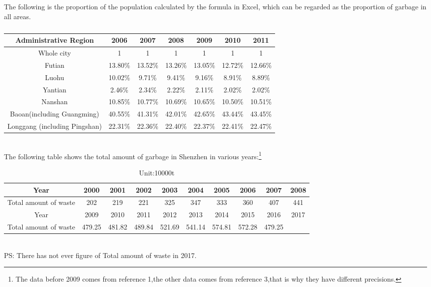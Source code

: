 \documentclass[UTF8]{article}
\begin{document}
The following is the proportion of the population calculated by the formula in Excel, which can be regarded as the proportion of garbage in all areas.
\begin{table}[h]
\caption{}
\begin{center}
\begin{tabular}{ccccccc}
\hline
Administrative Region&2006&2007&2008&2009&2010&2011\\
\hline
Whole city&1&1&1&1&1&1\\
\hline
Futian&13.80\%&13.52\%&13.26\%&13.05\%&12.72\%&12.66\%\\
\hline
Luohu&10.02\%&9.71\%&9.41\%&9.16\%&8.91\%&8.89\%\\
\hline
Yantian&2.46\%&2.34\%&2.22\%&2.11\%&2.02\%&2.02\%\\
\hline
Nanshan&10.85\%&10.77\%&10.69\%&10.65\%&10.50\%&10.51\%\\
\hline
Baoan(including Guangming)&40.55\%&41.31\%&42.01\%&42.65\%&43.44\%&43.45\%\\
\hline
Longgang (including Pingshan)&22.31\%&22.36\%&22.40\%&22.37\%&22.41\%&22.47\%\\
\hline
\end{tabular}
\end{center}
\end{table}\\
\indent The following table shows the total amount of garbage in Shenzhen in various years:\footnote{The data before 2009 comes from reference 1,the other data comes from reference 3,that is why they have different precisions.}\\
\begin{table}[h]
\caption{ Unit:10000t}
\begin{center}
\begin{tabular}{cccccccccc}
\hline
Year&2000&2001&2002&2003&2004&2005&2006&2007&2008\\
\hline
Total amount of waste &202&219&221&325&347&333&360&407&441\\
\hline
Year&2009&2010&2011&2012&2013&2014&2015&2016&2017\\
\hline
Total amount of waste&479.25&481.82&489.84&521.69&541.14&574.81&572.28&479.25&\\
\hline
\end{tabular}
\end{center}
\end{table}\\
\indent PS: There has not ever figure of Total amount of waste in 2017.\\
\end{document}
